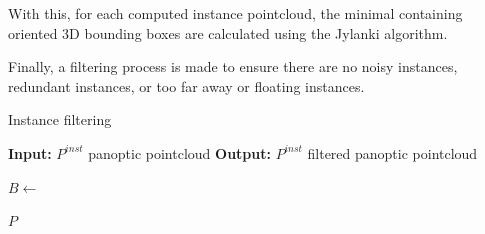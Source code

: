
With this, for each computed instance pointcloud, the minimal containing oriented 3D bounding boxes are calculated using the Jylanki algorithm.

Finally, a filtering process is made to ensure there are no noisy instances, redundant instances, or too far away or floating instances.


\begin{algorithm}
    \caption{Instance filtering}
    \label{algorithm:instance_filter}
    \footnotesize

    \begin{algorithmic}[1]
        \State \textbf{Input:} $P^{inst}$ panoptic pointcloud
        \State \textbf{Output:} $P^{inst}$ filtered panoptic pointcloud
        
                \State $B \gets $
            
            \EndFor
        \EndFor
        
        \State \Return $P$
    \end{algorithmic}
\end{algorithm}



